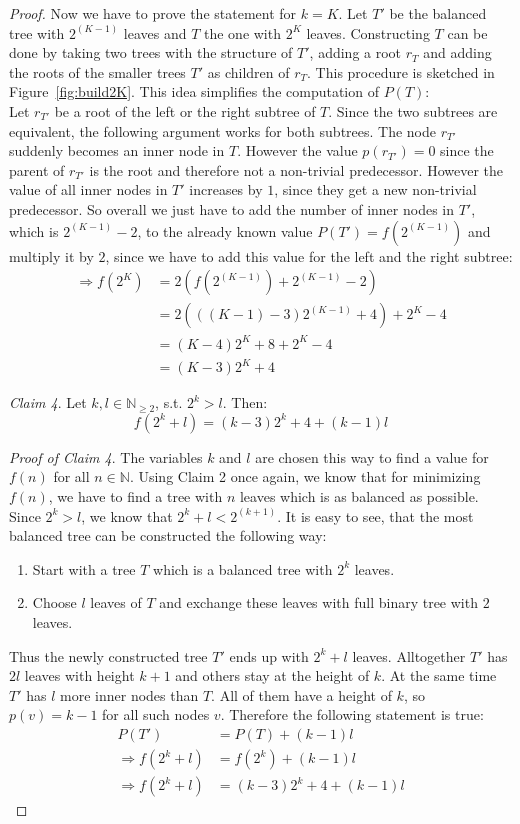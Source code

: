 \begin{proof}
Now we have to prove the statement for $k = K$. Let $T'$ be the balanced tree with $2^{(K-1)}$ leaves and $T$ the one with $2^K$ leaves. Constructing $T$ can be done by taking two trees with the structure of $T'$, adding a root $r_T$ and adding the roots of the smaller trees $T'$ as children of $r_T$. This procedure is sketched in Figure~\ref{fig:build2K}. This idea simplifies the computation of $P(T)$:\\
Let $r_{T'}$ be a root of the left or the right subtree of $T$. Since the two subtrees are equivalent, the following argument works for both subtrees. The node $r_{T'}$ suddenly becomes an inner node in $T$. However the value $p(r_{T'}) = 0$ since the parent of $r_{T'}$ is the root and therefore not a non-trivial predecessor. However the value of all inner nodes in $T'$ increases by $1$, since they get a new non-trivial predecessor. So overall we just have to add the number of inner nodes in $T'$, which is $2^{(K-1)}-2$, to the already known value $P(T')=f(2^{(K-1)})$ and multiply it by $2$, since we have to add this value for the left and the right subtree:
\begin{align*}
\Rightarrow f(2^K) &= 2(f(2^{(K-1)}) + 2^{(K-1)}-2) \\
&= 2(((K-1)-3)2^{(K-1)}+4) + 2^K -4 \\
&= (K-4)2^K +8 +2^K -4 \\
&= (K-3)2^K +4
\end{align*}

\textit{Claim 4}. Let $k,l \in \mathbb{N}_{\geq 2}$, s.t. $2^k > l$. Then:
$$f(2^k+l) = (k-3)2^k + 4 + (k-1)l$$

\textit{Proof of Claim 4}. The variables $k$ and $l$ are chosen this way to find a value for $f(n)$ for all $n \in \mathbb{N}$. Using Claim 2 once again, we know that for minimizing $f(n)$, we have to find a tree with $n$ leaves which is as balanced as possible. Since $2^k > l$, we know that $2^k + l < 2^{(k+1)}$. It is easy to see, that the most balanced tree can be constructed the following way:
\begin{enumerate}
\item Start with a tree $T$ which is a balanced tree with $2^k$ leaves.
\item Choose $l$ leaves of $T$ and exchange these leaves with full binary tree with $2$ leaves.
\end{enumerate}
Thus the newly constructed tree $T'$ ends up with $2^k+l$ leaves. Alltogether $T'$ has $2l$ leaves with height $k+1$ and others stay at the height of $k$. At the same time $T'$ has $l$ more inner nodes than $T$. All of them have a height of $k$, so $p(v)=k-1$ for all such nodes $v$. Therefore the following statement is true:
\begin{align*}
P(T') &= P(T) + (k-1)l \\
\Rightarrow f(2^k+l) &= f(2^k) + (k-1)l \\
\Rightarrow f(2^k+l) &= (k-3)2^k + 4 + (k-1)l
\end{align*}


\end{proof}
